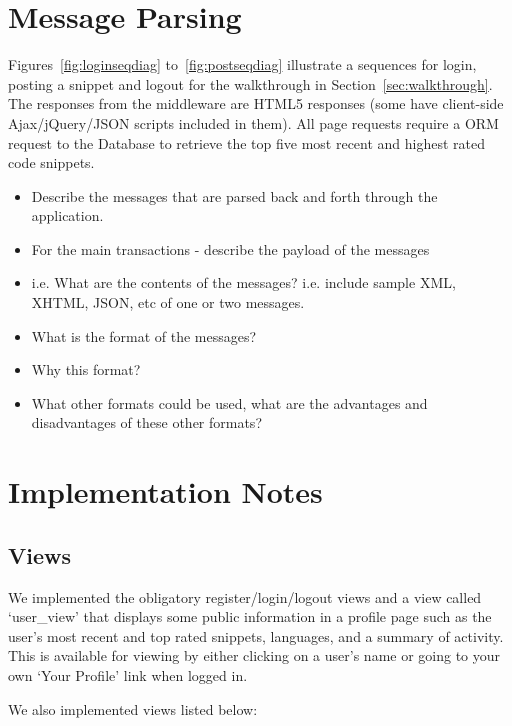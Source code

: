 \documentclass{sig-alt-release2}
\begin{document}
\section{Message Parsing}

Figures~\ref{fig:loginseqdiag} to~\ref{fig:postseqdiag} illustrate a
sequences for login, posting a snippet and logout for the
walkthrough in Section~\ref{sec:walkthrough}. The responses from the
middleware are HTML5 responses (some have client-side Ajax/jQuery/JSON
scripts included in them). All page requests require a ORM request to
the Database to retrieve the top five most recent and highest rated
code snippets.

\begin{itemize}
\item Describe the messages that are parsed back and forth through
the application.
\item	For the main transactions - describe the payload of the messages 
\item	i.e. What are the contents of the messages? i.e. include
sample XML, XHTML, JSON, etc of one or two messages.
\item	What is the format of the messages? 
\item	Why this format? 
\item	What other formats could be used, what are the advantages
and disadvantages of these other formats?
\end{itemize}

\section{Implementation Notes}

\subsection{Views}

We implemented the obligatory register/login/logout views and a view called
`user\_view' that displays some public information in a profile page such as
the user's most recent and top rated snippets, languages, and a summary of
activity. This is available for viewing by either clicking on a user's name
or going to your own `Your Profile' link when logged in.

We also implemented views listed below:
\end{document}
